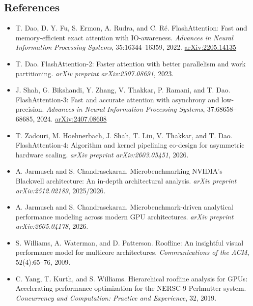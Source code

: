 \subsection{References}\label{references}

\begin{itemize}
\tightlist
\item
  T. Dao, D. Y. Fu, S. Ermon, A. Rudra, and C. Ré. FlashAttention: Fast
  and memory-efficient exact attention with IO-awareness. \emph{Advances
  in Neural Information Processing Systems}, 35:16344--16359, 2022.
  \href{https://arxiv.org/abs/2205.14135}{arXiv:2205.14135}
\item
  T. Dao. FlashAttention-2: Faster attention with better parallelism and
  work partitioning. \emph{arXiv preprint arXiv:2307.08691}, 2023.
\item
  J. Shah, G. Bikshandi, Y. Zhang, V. Thakkar, P. Ramani, and T. Dao.
  FlashAttention-3: Fast and accurate attention with asynchrony and
  low-precision. \emph{Advances in Neural Information Processing
  Systems}, 37:68658--68685, 2024.
  \href{https://arxiv.org/abs/2407.08608}{arXiv:2407.08608}
\item
  T. Zadouri, M. Hoehnerbach, J. Shah, T. Liu, V. Thakkar, and T. Dao.
  FlashAttention-4: Algorithm and kernel pipelining co-design for
  asymmetric hardware scaling. \emph{arXiv preprint arXiv:2603.05451},
  2026.
\item
  A. Jarmusch and S. Chandrasekaran. Microbenchmarking NVIDIA's
  Blackwell architecture: An in-depth architectural analysis.
  \emph{arXiv preprint arXiv:2512.02189}, 2025/2026.
\item
  A. Jarmusch and S. Chandrasekaran. Microbenchmark-driven analytical
  performance modeling across modern GPU architectures. \emph{arXiv
  preprint arXiv:2605.04178}, 2026.
\item
  S. Williams, A. Waterman, and D. Patterson. Roofline: An insightful
  visual performance model for multicore architectures.
  \emph{Communications of the ACM}, 52(4):65--76, 2009.
\item
  C. Yang, T. Kurth, and S. Williams. Hierarchical roofline analysis for
  GPUs: Accelerating performance optimization for the NERSC-9 Perlmutter
  system. \emph{Concurrency and Computation: Practice and Experience},
  32, 2019.
\end{itemize}
